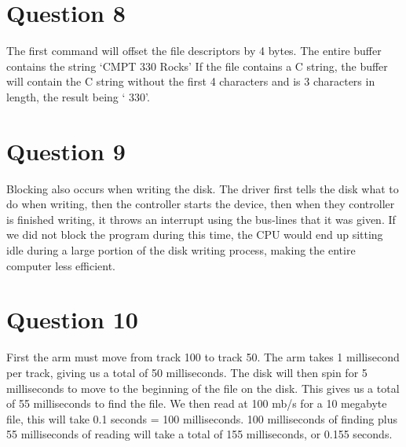 \documentclass[12pt]{extarticle}
\begin{document}
		\section*{Question 8}
			The first command will offset the file descriptors by 4 bytes.  The entire buffer contains the string `CMPT 330 Rocks'  If the file contains a C string, the buffer will contain the C string without the first 4 characters and is 3 characters in length, the result being ` 330'.

		\section*{Question 9}
			Blocking also occurs when writing the disk.  The driver first tells the disk what to do when writing, then the controller starts the device, then when they controller is finished writing, it throws an interrupt using the bus-lines that it was given.  If we did not block the program during this time,  the CPU would end up sitting idle during a large portion of the disk writing process, making the entire computer less efficient.

		\section*{Question 10}
			First the arm must move from track 100 to track 50.  The arm takes 1 millisecond per track, giving us a total of 50 milliseconds.  The disk will then spin for 5 milliseconds to move to the beginning of the file on the disk.  This gives us a total of 55 milliseconds to find the file.  We then read at 100 mb/s for a 10 megabyte file, this will take 0.1 seconds = 100 milliseconds.  100 milliseconds of finding plus 55 milliseconds of reading will take a total of 155 milliseconds, or 0.155 seconds.
\end{document}
